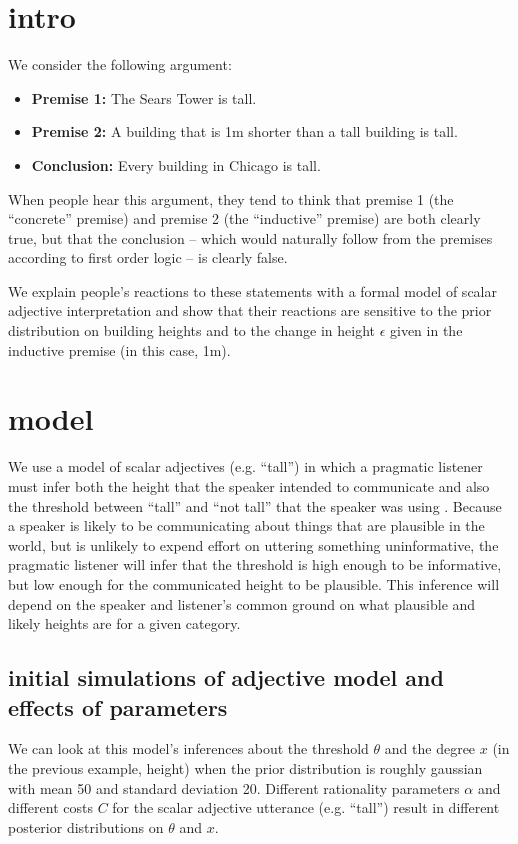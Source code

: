 \documentclass[10pt]{article}
\begin{document}
\setlength{\droptitle}{-1.5cm}
\maketitle

\section{intro}
  We consider the following argument:
  
  \begin{itemize}
   \item[] \textbf{Premise 1:} The Sears Tower is tall.
   \item[] \textbf{Premise 2:} A building that is 1m shorter than a tall building is tall.
   \item[] \textbf{Conclusion:} Every building in Chicago is tall.
  \end{itemize}
  
  When people hear this argument, they tend to think that premise 1 (the ``concrete'' premise) and premise 2 (the ``inductive'' premise) are both clearly true, but that the conclusion -- which would naturally follow from the premises according to first order logic -- is clearly false.
  
  We explain people's reactions to these statements with a formal model of scalar adjective interpretation and show that their reactions are sensitive to the prior distribution on building heights and to the change in height $\epsilon$ given in the inductive premise (in this case, 1m).
  
\section{model}
  We use a model of scalar adjectives (e.g. ``tall'') in which a pragmatic listener must infer both the height that the speaker intended to communicate and also the threshold between ``tall'' and ``not tall'' that the speaker was using \cite{lassiter}. Because a speaker is likely to be communicating about things that are plausible in the world, but is unlikely to expend effort on uttering something uninformative, the pragmatic listener will infer that the threshold is high enough to be informative, but low enough for the communicated height to be plausible. This inference will depend on the speaker and listener's common ground on what plausible and likely heights are for a given category.
  
  \subsection{initial simulations of adjective model and effects of parameters}
    We can look at this model's inferences about the threshold $\theta$ and the degree $x$ (in the previous example, height) when the prior distribution is roughly gaussian with mean 50 and standard deviation 20. Different rationality parameters $\alpha$ and different costs $C$ for the scalar adjective utterance (e.g. ``tall'') result in different posterior distributions on $\theta$ and $x$.
    
\end{document}
